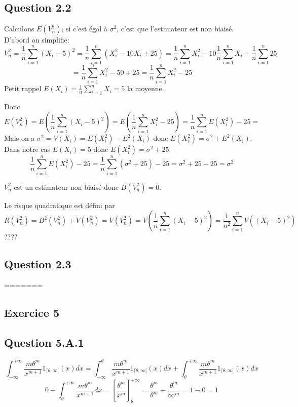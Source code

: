 \documentclass[]{book}
\theoremstyle{definition}
\begin{document}
\subsection*{Question 2.2}
Calculons $E(V_n^2)$, si c'est \'egal \`a $\sigma^2$, c'est que l'estimateur est non biais\'e.
D'abord on simplifie:
$$
V_n^2 = \frac{1}{n}\sum_{i=1}^{n}{(X_i -5)^2} = \frac{1}{n}\sum_{i=1}^{n}{(X_i^2 -10X_i + 25)} = \frac{1}{n}\sum_{i=1}^{n}{X_i^2} -10\frac{1}{n}\sum_{i=1}^{n}{X_i} + \frac{1}{n}\sum_{i=1}^{n}{25}
$$
$$
= \frac{1}{n}\sum_{i=1}^{n}{X_i^2} -50 + 25 = \frac{1}{n}\sum_{i=1}^{n}{X_i^2} -25
$$
Petit rappel $E(X_i) = \frac{1}{n}\sum_{i=1}^{n}{X_i} = 5$ la moyenne.

Donc
$$
E(V_n^2) = E\left(\frac{1}{n}\sum_{i=1}^{n}{(X_i -5)^2}\right) =  E\left(\frac{1}{n}\sum_{i=1}^{n}{X_i^2} -25\right) = \frac{1}{n} \sum_{i=1}^{n}{E(X_i^2)} -25 = 
$$
Mais on a $\sigma^2 = V(X_i) = E(X_i^2) - E^2(X_i) $ donc $E(X_i^2) = \sigma^2 + E^2(X_i)$. Dans notre cas $E(X_i) = 5$ donc $E(X_i^2) = \sigma^2 + 25$.
$$
\frac{1}{n} \sum_{i=1}^{n}{E(X_i^2)} -25 = \frac{1}{n} \sum_{i=1}^{n}{(\sigma^2 + 25)} -25 = \sigma^2 + 25-25 = \sigma^2  
$$

$V_n^2$ est un estimateur non biais\'e donc $B(V_n^2) = 0$.


Le risque quadratique est d\'efini par
$$
R(V_n^2) =  B^2(V_n^2) + V(V_n^2) = V(V_n^2) = V \left( \frac{1}{n}\sum_{i=1}^{n}{(X_i -5)^2} \right) = \frac{1}{n^2} \sum_{i=1}^{n}{V((X_i -5)^2)}
$$
????

\subsection*{Question 2.3}

=======
\subsection*{Exercice 5}
\subsection*{Question 5.A.1}

$$
\int_{-\infty}^{+\infty}{\frac{m \theta^m}{x^{m+1}}1_{\lceil \theta, \infty[}(x) dx} = 
\int_{-\infty}^{\theta}{\frac{m \theta^m}{x^{m+1}}1_{\lceil \theta, \infty[}(x) dx} + \int_{\theta}^{+\infty}{\frac{m \theta^m}{x^{m+1}}1_{\lceil \theta, \infty[}(x) dx}
$$
$$
0 + \int_{\theta}^{+\infty}{\frac{m \theta^m}{x^{m+1}} dx} =
\left[\frac{\theta^m}{x^m}\right]_{\theta}^{+\infty} =
\frac{\theta^m}{\theta^m} - \frac{\theta^m}{\infty^m} = 1 - 0 = 1
$$
\end{document}
